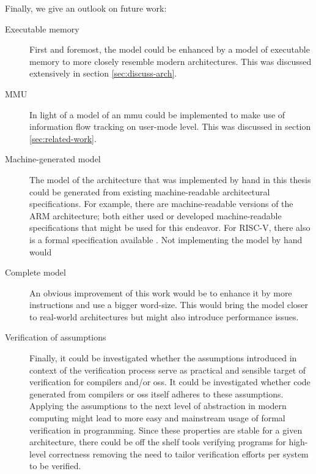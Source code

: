 Finally, we give an outlook on future work:
\begin{description}
    \item[Executable memory] First and foremost, the model could be enhanced by a model of executable memory to more closely resemble modern architectures.
    This was discussed extensively in section \ref{sec:discuss-arch}.
    \item[MMU] In light of \cite{KhakpourSD13} a model of an \gls{mmu} could be implemented to make use of information flow tracking on user-mode level.
    This was discussed in section \ref{sec:related-work}.
    \item[Machine-generated model] The model of the architecture that was implemented by hand in this thesis could be generated from existing machine-readable architectural specifications.
    For example, there are machine-readable versions of the ARM architecture; both \cite{Reid17,Fox02} either used or developed machine-readable specifications that might be used for this endeavor.
    For RISC-V, there also is a formal specification available \cite{RiscvSpecFormal}.
    Not implementing the model by hand would 
    \item[Complete model] An obvious improvement of this work would be to enhance it by more instructions and use a bigger word-size.
    This would bring the model closer to real-world architectures but might also introduce performance issues.
    \item[Verification of assumptions] Finally, it could be investigated whether the assumptions introduced in context of the verification process serve as practical and sensible target of verification for compilers and/or \glspl{os}.
    It could be investigated whether code generated from compilers or \glspl{os} itself adheres to these assumptions.
    Applying the assumptions to the next level of abstraction in modern computing might lead to more easy and mainstream usage of formal verification in programming.
    Since these properties are stable for a given architecture, there could be off the shelf tools verifying programs for high-level correctness removing the need to tailor verification efforts per system to be verified.
\end{description}

